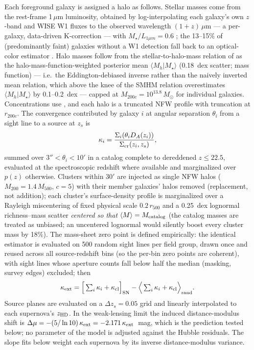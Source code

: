 \documentclass[twocolumn]{aastex701}
\newcommand{\kext}{\kappa_{\rm ext}}
\newcommand{\dmu}{\Delta\mu}
\newcommand{\msun}{M_\odot}
\begin{document}
Each foreground galaxy is assigned a halo as follows. Stellar masses come
from the rest-frame 1\,$\mu$m luminosity, obtained by log-interpolating
each galaxy's own $z$-band and WISE W1 fluxes to the observed wavelength
$(1+z)\,\mu$m --- a per-galaxy, data-driven K-correction --- with
$M_\star/L_{1\mu m} = 0.6$ \citep{Meidt2014,Kettlety2018}; the 13--15\%
of (predominantly faint) galaxies without a W1 detection fall back to an
optical-color estimator \citep{Taylor2011}. Halo masses follow from the
stellar-to-halo-mass relation of \citet{Behroozi2013} as the
halo-mass-function-weighted posterior mean $\langle M_h | M_\star
\rangle$ (0.18~dex scatter; \citealt{Despali2016} mass function) ---
i.e.\ the Eddington-debiased inverse rather than the naively inverted
mean relation, which above the knee of the SMHM relation overestimates
$\langle M_h | M_\star\rangle$ by 0.1--0.2~dex --- capped at $M_{200c} =
10^{13.8}\,\msun$ for individual galaxies. Concentrations use
\citet{DiemerJoyce2019}, and each halo is a truncated NFW profile
\citep{BMO2009} with truncation at $r_{200c}$. The convergence
contributed by galaxy $i$ at angular separation $\theta_i$ from a sight
line to a source at $z_s$ is
\begin{equation}
\kappa_i = \frac{\Sigma_i\!\left(\theta_i D_A(z_i)\right)}
{\Sigma_{\rm cr}(z_i, z_s)},
\end{equation}
summed over $3'' < \theta_i < 10'$ in a catalog complete to dereddened
$z \le 22.5$, evaluated at the spectroscopic redshift where available and
marginalized over $p(z)$ otherwise. Clusters within $30'$ are injected
as single NFW halos ($M_{200} = 1.4\,M_{500}$, $c=5$) with their member
galaxies' halos removed (replacement, not addition); each cluster's
surface-density profile is marginalized over a Rayleigh miscentering of
fixed physical scale $0.2\,r_{500}$ and a 0.25~dex lognormal
richness--mass scatter \emph{centered so that} $\langle M \rangle =
M_{\rm catalog}$ (the catalog masses are treated as unbiased; an
uncentered lognormal would silently boost every cluster mass by 18\%).
The mass-sheet zero point is defined empirically: the identical
estimator is evaluated on 500 random sight lines per field group, drawn
once and reused across all source-redshift bins (so the per-bin zero
points are coherent), with sight lines whose aperture counts fall below
half the median (masking, survey edges) excluded; then
\begin{equation}
\kext = \Big[\textstyle\sum_i \kappa_i + \kappa_{\rm cl}\Big]_{\rm SN}
- \Big\langle\textstyle\sum_i \kappa_i + \kappa_{\rm cl}\Big\rangle_{\rm rand}.
\end{equation}
Source planes are evaluated on a $\Delta z_s = 0.05$ grid and linearly
interpolated to each supernova's $z_{\rm HD}$. In the weak-lensing
limit the induced distance-modulus shift is $\dmu = -(5/\ln 10)\,\kext =
-2.171\,\kext$~mag, which is the prediction tested below; no parameter of
the model is adjusted against the Hubble residuals. The slope fits below
weight each supernova by its inverse distance-modulus variance.
\end{document}

